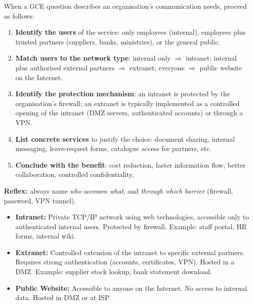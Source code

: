 \documentclass[11pt]{article}
\newcommand{\cle}[1]{{\popxbold\color{popdark}#1}}
\begin{document}
\begin{methode}
When a GCE question describes an organisation's communication needs, proceed as follows:
\begin{enumerate}
\item \textbf{Identify the users} of the service: only employees (internal), employees plus trusted partners (suppliers, banks, ministries), or the general public.
\item \textbf{Match users to the network type}: internal only $\Rightarrow$ \cle{intranet}; internal plus authorised external partners $\Rightarrow$ \cle{extranet}; everyone $\Rightarrow$ public website on the Internet.
\item \textbf{Identify the protection mechanism}: an intranet is protected by the organisation's \cle{firewall}; an extranet is typically implemented as a controlled opening of the intranet (DMZ servers, authenticated accounts) or through a \cle{VPN}.
\item \textbf{List concrete services} to justify the choice: document sharing, internal messaging, leave-request forms, catalogue access for partners, etc.
\item \textbf{Conclude with the benefit}: cost reduction, faster information flow, better collaboration, controlled confidentiality.
\end{enumerate}
\textbf{Reflex:} always name \emph{who} accesses \emph{what}, and \emph{through which barrier} (firewall, password, VPN tunnel).
\end{methode}

\begin{aretenir}
\begin{itemize}
\item \textbf{Intranet:} Private TCP/IP network using web technologies, accessible only to authenticated internal users. Protected by firewall. Example: staff portal, HR forms, internal wiki.
\item \textbf{Extranet:} Controlled extension of the intranet to specific external partners. Requires strong authentication (accounts, certificates, VPN). Hosted in a DMZ. Example: supplier stock lookup, bank statement download.
\item \textbf{Public Website:} Accessible to anyone on the Internet. No access to internal data. Hosted in DMZ or at ISP.
\end{itemize}
\end{aretenir}
\end{document}
